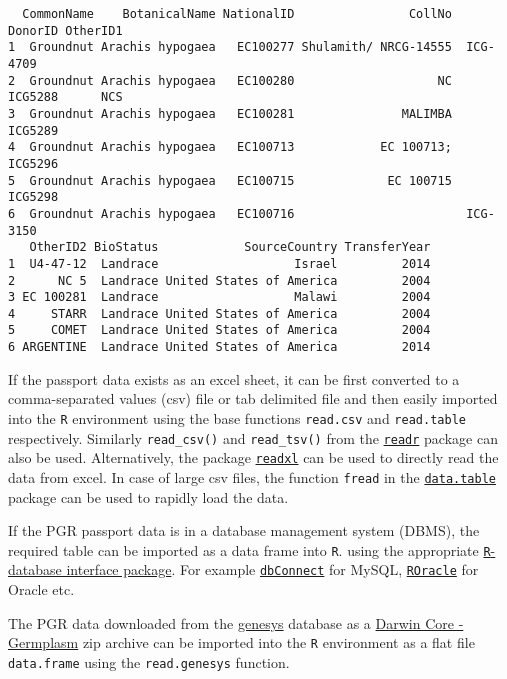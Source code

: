 \documentclass[
]{article}
\begin{document}
\begin{verbatim}
  CommonName    BotanicalName NationalID                CollNo   DonorID OtherID1
1  Groundnut Arachis hypogaea   EC100277 Shulamith/ NRCG-14555  ICG-4709         
2  Groundnut Arachis hypogaea   EC100280                    NC   ICG5288      NCS
3  Groundnut Arachis hypogaea   EC100281               MALIMBA   ICG5289         
4  Groundnut Arachis hypogaea   EC100713            EC 100713;   ICG5296         
5  Groundnut Arachis hypogaea   EC100715             EC 100715   ICG5298         
6  Groundnut Arachis hypogaea   EC100716                        ICG-3150         
   OtherID2 BioStatus            SourceCountry TransferYear
1  U4-47-12  Landrace                   Israel         2014
2      NC 5  Landrace United States of America         2004
3 EC 100281  Landrace                   Malawi         2004
4     STARR  Landrace United States of America         2004
5     COMET  Landrace United States of America         2004
6 ARGENTINE  Landrace United States of America         2014
\end{verbatim}

If the passport data exists as an excel sheet, it can be first converted
to a comma-separated values (csv) file or tab delimited file and then
easily imported into the \texttt{R} environment using the base functions
\texttt{read.csv} and \texttt{read.table} respectively. Similarly
\texttt{read\_csv()} and \texttt{read\_tsv()} from the
\href{https://CRAN.R-project.org/package=readr}{\texttt{readr}} package
can also be used. Alternatively, the package
\href{https://CRAN.R-project.org/package=readxl}{\texttt{readxl}} can be
used to directly read the data from excel. In case of large csv files,
the function \texttt{fread} in the
\href{https://CRAN.R-project.org/package=data.table}{\texttt{data.table}}
package can be used to rapidly load the data.

If the PGR passport data is in a database management system (DBMS), the
required table can be imported as a data frame into \texttt{R}. using
the appropriate
\href{http://www.burns-stat.com/r-database-interfaces/}{\texttt{R}-database
interface package}. For example
\href{https://CRAN.R-project.org/package=dbConnect}{\texttt{dbConnect}}
for MySQL,
\href{https://CRAN.R-project.org/package=ROracle}{\texttt{ROracle}} for
Oracle etc.

The PGR data downloaded from the
\href{https://www.genesys-pgr.org/welcome}{genesys} database as a
\href{https://github.com/dagendresen/darwincore-germplasm}{Darwin Core -
Germplasm} zip archive can be imported into the \texttt{R} environment
as a flat file \texttt{data.frame} using the \texttt{read.genesys}
function.
\end{document}
